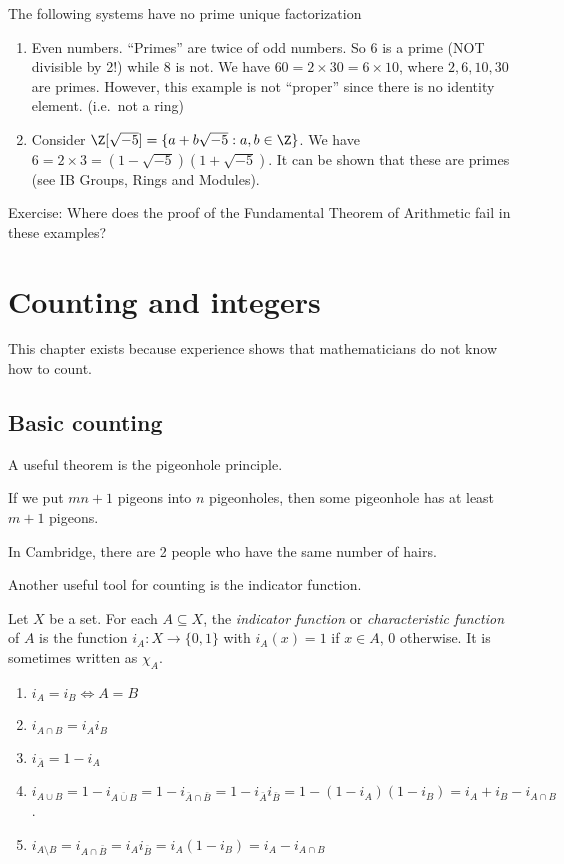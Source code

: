 \documentclass[a4paper]{article}
\begin{document}
\begin{eg}
  The following systems have no prime unique factorization
  \begin{enumerate}
    \item Even numbers. ``Primes'' are twice of odd numbers. So 6 is a prime (NOT divisible by 2!) while 8 is not. We have $60 = 2\times 30 = 6\times 10$, where $2, 6, 10, 30$ are primes. However, this example is not ``proper'' since there is no identity element. (i.e.\ not a ring)
    \item Consider $\Z[\sqrt{-5}] = \{a + b\sqrt{-5} : a, b\in \Z\}$. We have $6 = 2\times 3 = (1 - \sqrt{-5})(1 + \sqrt{-5})$. It can be shown that these are primes (see IB Groups, Rings and Modules).
  \end{enumerate}
\end{eg}
Exercise: Where does the proof of the Fundamental Theorem of Arithmetic fail in these examples?

\section{Counting and integers}
This chapter exists because experience shows that mathematicians do not know how to count.

\subsection{Basic counting}
A useful theorem is the pigeonhole principle.
\begin{thm}
  If we put $mn + 1$ pigeons into $n$ pigeonholes, then some pigeonhole has at least $m + 1$ pigeons.
\end{thm}

\begin{eg}
  In Cambridge, there are 2 people who have the same number of hairs.
\end{eg}

Another useful tool for counting is the indicator function.
\begin{defi}
  Let $X$ be a set. For each $A\subseteq X$, the \emph{indicator function} or \emph{characteristic function} of $A$ is the function $i_A: X\to \{0, 1\}$ with $i_A(x) = 1$ if $x\in A$, $0$ otherwise. It is sometimes written as $\chi_A$.
\end{defi}
\begin{prop}\leavevmode
  \begin{enumerate}
    \item $i_A = i_B \Leftrightarrow A = B$
    \item $i_{A\cap B} = i_A i_B$
    \item $i_{\bar{A}} = 1 - i_A$
    \item $i_{A\cup B} = 1 - i_{\overline{A\cup B}} = 1 - i_{\bar A\cap \bar B} = 1 - i_{\bar{A}}i_{\bar{B}} = 1 - (1 - i_A)(1 - i_B) = i_A + i_B - i_{A\cap B}$.
    \item $i_{A\setminus B} = i_{A\cap \bar B} = i_Ai_{\bar B} = i_A(1 - i_B) = i_A - i_{A\cap B}$
  \end{enumerate}
\end{prop}
\end{document}
